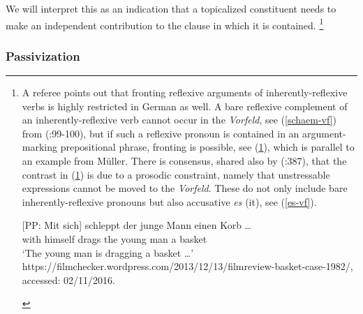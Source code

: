 \documentclass[output=paper]{langsci/langscibook}
\begin{document}
We will interpret this as an indication that a  topicalized constituent needs to make an independent contribution to the clause in which it is contained.%
\footnote{A referee points out that fronting reflexive arguments of inherently-reflexive verbs is highly restricted in  German as well. A bare reflexive complement of an inherently-reflexive verb cannot occur in the \textit{Vorfeld}, see (\ref{schaem-vf}) from \citeauthor{Mueller:99} (\citeyear{Mueller:99}:99-100), but if such a reflexive pronoun is contained in an argument-marking prepositional phrase, fronting is possible, see (\ref{schlepp-vf}), which is parallel to an example from M\"uller. There is consensus, shared also by \citeauthor{Mueller:99} (\citeyear{Mueller:99}:387), that the contrast in (\ref{sich-vf}) is due to a prosodic constraint, namely that unstressable expressions cannot be moved to the \textit{Vorfeld}. These do not only include bare inherently-reflexive pronouns but also accusative \textit{es} (it), see (\ref{es-vf}).

\begin{exe}
\ex\label{sich-vf}
\begin{xlist}
\ex \label{schlepp-vf}{
\gll \textnormal{[}PP: Mit sich\textnormal{]} {} schleppt der junge Mann einen Korb \ldots\\
{} with himself {} drags the young man a basket\\
\glt `The young man is dragging a basket \ldots'\\
\tiny{https://filmchecker.wordpress.com/2013/12/13/filmreview-basket-case-1982/, accessed: 02/11/2016.}
}
\end{xlist}
\end{exe}

}
 


\subsubsection{Passivization}
\end{document}
